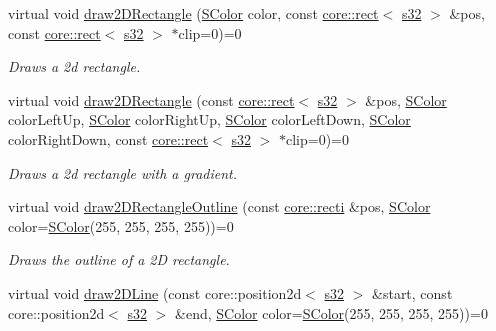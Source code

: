 \begin{DoxyCompactItemize}
virtual void \hyperlink{classirr_1_1video_1_1IVideoDriver_ac7f452fae0ef8abe01768a78ba7033b7}{draw2\+D\+Rectangle} (\hyperlink{classirr_1_1video_1_1SColor}{S\+Color} color, const \hyperlink{classirr_1_1core_1_1rect}{core\+::rect}$<$ \hyperlink{namespaceirr_ac66849b7a6ed16e30ebede579f9b47c6}{s32} $>$ \&pos, const \hyperlink{classirr_1_1core_1_1rect}{core\+::rect}$<$ \hyperlink{namespaceirr_ac66849b7a6ed16e30ebede579f9b47c6}{s32} $>$ $\ast$clip=0)=0
\begin{DoxyCompactList}\small\item\em Draws a 2d rectangle. \end{DoxyCompactList}\item 
virtual void \hyperlink{classirr_1_1video_1_1IVideoDriver_a83bb3c30be6c9f960a4d8b625d7dee8c}{draw2\+D\+Rectangle} (const \hyperlink{classirr_1_1core_1_1rect}{core\+::rect}$<$ \hyperlink{namespaceirr_ac66849b7a6ed16e30ebede579f9b47c6}{s32} $>$ \&pos, \hyperlink{classirr_1_1video_1_1SColor}{S\+Color} color\+Left\+Up, \hyperlink{classirr_1_1video_1_1SColor}{S\+Color} color\+Right\+Up, \hyperlink{classirr_1_1video_1_1SColor}{S\+Color} color\+Left\+Down, \hyperlink{classirr_1_1video_1_1SColor}{S\+Color} color\+Right\+Down, const \hyperlink{classirr_1_1core_1_1rect}{core\+::rect}$<$ \hyperlink{namespaceirr_ac66849b7a6ed16e30ebede579f9b47c6}{s32} $>$ $\ast$clip=0)=0
\begin{DoxyCompactList}\small\item\em Draws a 2d rectangle with a gradient. \end{DoxyCompactList}\item 
virtual void \hyperlink{classirr_1_1video_1_1IVideoDriver_a65efe36e19f0570988848175a8af7bd1}{draw2\+D\+Rectangle\+Outline} (const \hyperlink{namespaceirr_1_1core_a628365d56b9d3ca9c887cd7f651f7b45}{core\+::recti} \&pos, \hyperlink{classirr_1_1video_1_1SColor}{S\+Color} color=\hyperlink{classirr_1_1video_1_1SColor}{S\+Color}(255, 255, 255, 255))=0
\begin{DoxyCompactList}\small\item\em Draws the outline of a 2D rectangle. \end{DoxyCompactList}\item 
virtual void \hyperlink{classirr_1_1video_1_1IVideoDriver_a7b5388e319a0ae1340c3d81db02dd959}{draw2\+D\+Line} (const core\+::position2d$<$ \hyperlink{namespaceirr_ac66849b7a6ed16e30ebede579f9b47c6}{s32} $>$ \&start, const core\+::position2d$<$ \hyperlink{namespaceirr_ac66849b7a6ed16e30ebede579f9b47c6}{s32} $>$ \&end, \hyperlink{classirr_1_1video_1_1SColor}{S\+Color} color=\hyperlink{classirr_1_1video_1_1SColor}{S\+Color}(255, 255, 255, 255))=0

\end{DoxyCompactItemize}
